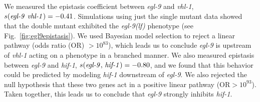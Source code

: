 \documentclass[9pt,twocolumn,twoside]{pnas-new}
\newcommand{\gene}[1]{\mbox{\emph{#1}}}
\newcommand{\egl}{\gene{egl-9(lf)}}
\begin{document}
We measured the epistasis coefficient between \gene{egl-9} and \gene{vhl-1},
$s({\text{\gene{egl-9} \gene{vhl-1}}}) = -0.41$. Simulations using just the
single mutant data showed that the double mutant exhibited the \egl{} phenotype
(see Fig.~\ref{fig:egl9epistasis}). We used Bayesian model selection to reject a
linear pathway (odds ratio (OR) $>10^{83}$), which leads us to conclude
\gene{egl-9} is upstream of \gene{vhl-1} acting on a phenotype in a branched
manner. We also measured epistasis between \gene{egl-9} and \gene{hif-1},
$s({\text{\gene{egl-9}, \gene{hif-1}}}) = -0.80$, and we found that this
behavior could be predicted by modeling \gene{hif-1} downstream of \gene{egl-9}.
We also rejected the null hypothesis that these two genes act in a positive
linear pathway (OR$> 10^{93}$). Taken together, this leads us to conclude that
\gene{egl-9} strongly inhibits \gene{hif-1}.
\end{document}
